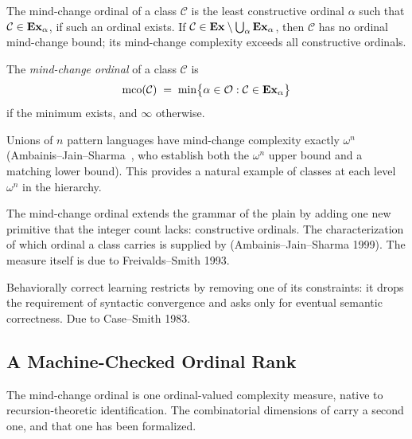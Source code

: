 The mind-change ordinal of a class $\mathcal{C}$ is the least
constructive ordinal $\alpha$ such that $\mathcal{C} \in \mathbf{Ex}_\alpha$,
if such an ordinal exists.  If $\mathcal{C} \in \mathbf{Ex} \setminus
\bigcup_\alpha \mathbf{Ex}_\alpha$, then $\mathcal{C}$ has no ordinal
mind-change bound; its mind-change complexity exceeds all constructive
ordinals.

\begin{defn}
\label{def:mco-class}
The \emph{mind-change ordinal} of a class $\mathcal{C}$ is
\[
  \mathrm{mco}(\mathcal{C}) \;=\;
  \min\bigl\{\alpha \in \mathcal{O} : \mathcal{C} \in \mathbf{Ex}_\alpha\bigr\}
\]
if the minimum exists, and $\infty$ otherwise.
\end{defn}

\begin{example}
\label{ex:pattern-languages}
Unions of $n$ pattern languages have mind-change complexity exactly
$\omega^n$ (Ambainis--Jain--Sharma~\cite{AmbainisJainSharma1999}, who
establish both the $\omega^n$ upper bound and a matching lower bound).
This provides a natural example of classes at each level $\omega^n$
in the hierarchy.
\end{example}

\begin{graphnode}[title={\nde{mind\_change\_ordinal}}]
The mind-change ordinal extends the grammar of the plain
 by adding one new primitive that the integer
count lacks: constructive ordinals.  The characterization of which
ordinal a class carries is supplied by 
(Ambainis--Jain--Sharma 1999).  The measure itself is due to
Freivalds--Smith 1993.
\end{graphnode}

\begin{graphnode}[title={\nde{bc\_learning}}]
Behaviorally correct learning restricts  by removing one
of its constraints: it drops the requirement of syntactic convergence and
asks only for eventual semantic correctness.  Due to Case--Smith 1983.
\end{graphnode}


\subsection{A Machine-Checked Ordinal Rank}
\label{sec:ordinal-rank-formal}

The mind-change ordinal is one ordinal-valued complexity measure, native
to recursion-theoretic identification.  The combinatorial dimensions of
 carry a second one, and that one has been formalized.


